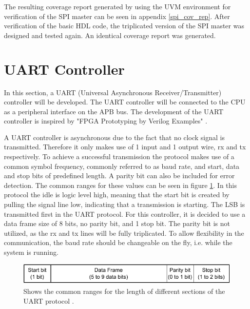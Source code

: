 \documentclass[./dissertation.tex]{subfiles}
\begin{document}
The resulting coverage report generated by using the UVM environment for verification of the SPI master can be seen in appendix \ref{spi_cov_rep}. After verification of the basic HDL code, the triplicated version of the SPI master was designed and tested again. An identical coverage report was generated. 







\section{UART Controller}
\label{uart_sec}
In this section, a UART (Universal Asynchronous Receiver/Transmitter) controller will be developed. The UART controller will be connected to the CPU as a peripheral interface on the APB bus. The development of the UART controller is inspired by "FPGA Prototyping by Verilog Examples" \cite{FPGAprototyping}. 

A UART controller is asynchronous due to the fact that no clock signal is transmitted. Therefore it only makes use of 1 input and 1 output wire, rx and tx respectively. To achieve a successful transmission the protocol makes use of a common symbol frequency, commonly referred to as baud rate, and start, data and stop bits of predefined length. A parity bit can also be included for error detection. The common ranges for these values can be seen in figure \ref{fig:uart_signals}. In this protocol the idle is logic level high, meaning that the start bit is created by pulling the signal line low, indicating that a transmission is starting. The LSB is transmitted first in the UART protocol. For this controller, it is decided to use a data frame size of 8 bits, no parity bit, and 1 stop bit. The parity bit is not utilized, as the rx and tx lines will be fully triplicated. To allow flexibility in the communication, the baud rate should be changeable on the fly, i.e. while the system is running.     

\begin{figure}[H]
    \centering
    \includegraphics[width = \linewidth]{subfiles/imgs/IP_Blocks_Pics/uart_signals.drawio.pdf}
    \caption{Shows the common ranges for the length of different sections of the UART protocol \cite{AnalogUART}.}
    \label{fig:uart_signals}
\end{figure}
\end{document}
